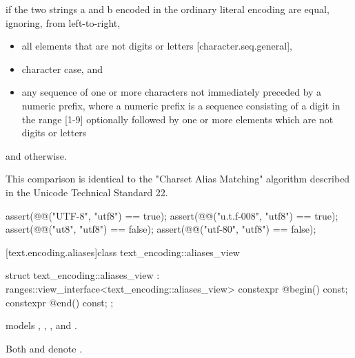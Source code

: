\documentclass{wg21}
\begin{document}
\begin{addedblock}
\begin{itemdescr}
\returns {} if the two strings a and b encoded in the ordinary literal encoding are equal, ignoring, from left-to-right,
\begin{itemize}
    \item all elements that are not digits or letters [character.seq.general],
    \item character case, and
    \item any sequence of one or more  characters not immediately preceded by a numeric prefix, where a numeric prefix is a sequence consisting of a digit in the range [1-9] optionally followed by one or more elements which are not digits or letters
\end{itemize}

and  otherwise.

\begin{note}
    This comparison is identical to the "Charset Alias Matching" algorithm described in the Unicode Technical Standard 22.
\end{note}

\begin{example}
    \begin{codeblock}
        assert(@@("UTF-8", "utf8") == true);
        assert(@@("u.t.f-008", "utf8") == true);
        assert(@@("ut8", "utf8") == false);
        assert(@@("utf-80", "utf8") == false);
    \end{codeblock}
\end{example}
\end{itemdescr}


[text.encoding.aliases]{class text_encoding::aliases_view}

\begin{codeblock}
struct text_encoding::aliases_view : ranges::view_interface<text_encoding::aliases_view> {
    constexpr @\impdef@ begin() const;
    constexpr @\impdef@ end() const;
};
\end{codeblock}

 models , , , and .

Both  and  denote .



\end{addedblock}
\end{document}
